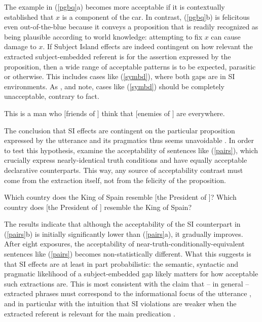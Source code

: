 \documentclass[output=paper,biblatex,babelshorthands,newtxmath,draftmode,colorlinks,citecolor=brown]{langscibook}
\begin{document}
\noindent
The example in (\ref{pgbq}a) becomes more acceptable if it is contextually established that $x$ is a
component of the car. In contrast, (\ref{pgbq}b) is felicitous even out-of-the-blue because it
conveys a proposition that is readily recognized as being plausible according to world knowledge:
attempting to fix $x$ can cause damage to $x$.  If Subject Island effects are indeed contingent on
how relevant the extracted subject-embedded referent is for the assertion expressed by the
proposition, then a wide range of acceptable patterns is to be expected, parasitic or
otherwise. This includes cases like (\ref{symbd}), where both gaps are in SI environments. As
\citet{Levine:Sag:03}, \citet[256]{levhubook} and \citet[161]{Culicover13} note, cases like
(\ref{symbd}) should be completely unacceptable, contrary to fact.


\eanoraggedright 
\label{symbd}
This is a man who $[$friends of \spcs $]$ think that $[$enemies of \spcs $]$ are everywhere.
\z 

The conclusion that SI effects are contingent on the particular proposition expressed by the
utterance and its pragmatics thus seems unavoidable \citep{chavesresp}. In order to test this
hypothesis, \citet{chavesresp} examine the acceptability of sentences like (\ref{pairs}), which
crucially express nearly-identical truth conditions and have equally acceptable declarative
counterparts. This way, any source of acceptability contrast must come from the extraction itself,
not from the felicity of the proposition.

\eal  \label{pairs}
\ex Which country does the King of  Spain resemble [the President of \spcs]?
\ex Which country does [the President of \spcs] resemble  the King of Spain?
\zl

\noindent
The results indicate that although the acceptability of the SI counterpart in (\ref{pairs}b) is
initially significantly lower than (\ref{pairs}a), it gradually improves.  After eight exposures,
the acceptability of near-truth-conditionally-equivalent sentences like (\ref{pairs}) becomes
non-statistically different.  What this suggests is that SI effects are at least in part
probabilistic: the semantic, syntactic and pragmatic likelihood of a subject-embedded gap likely
matters for how acceptable such extractions are. This is most consistent with the claim that -- in
general -- extracted phrases must correspond to the informational focus of the utterance
\citep{shir-jrn,valin86,kuno87,ken,Dean,goldberg13}, and in particular with the intuition that SI
violations are weaker when the extracted referent is relevant for the main predication
\citep[495]{kluender06}.
\end{document}
